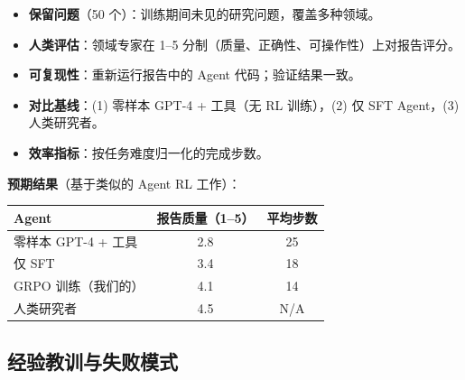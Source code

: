 \begin{keybox}
\begin{itemize}
  \item \textbf{保留问题}（50 个）：训练期间未见的研究问题，覆盖多种领域。
  \item \textbf{人类评估}：领域专家在 1--5 分制（质量、正确性、可操作性）上对报告评分。
  \item \textbf{可复现性}：重新运行报告中的 Agent 代码；验证结果一致。
  \item \textbf{对比基线}：(1) 零样本 GPT-4 + 工具（无 RL 训练），(2) 仅 SFT Agent，(3) 人类研究者。
  \item \textbf{效率指标}：按任务难度归一化的完成步数。
\end{itemize}

\textbf{预期结果}（基于类似的 Agent RL 工作）：

\begin{tabular}{@{}lcc@{}}
\toprule
\textbf{Agent} & \textbf{报告质量（1--5）} & \textbf{平均步数} \\
\midrule
零样本 GPT-4 + 工具 & 2.8 & 25 \\
仅 SFT & 3.4 & 18 \\
GRPO 训练（我们的） & 4.1 & 14 \\
人类研究者 & 4.5 & N/A \\
\bottomrule
\end{tabular}
\end{keybox}

\subsection{经验教训与失败模式}
\label{lessons-and-failure-modes}

